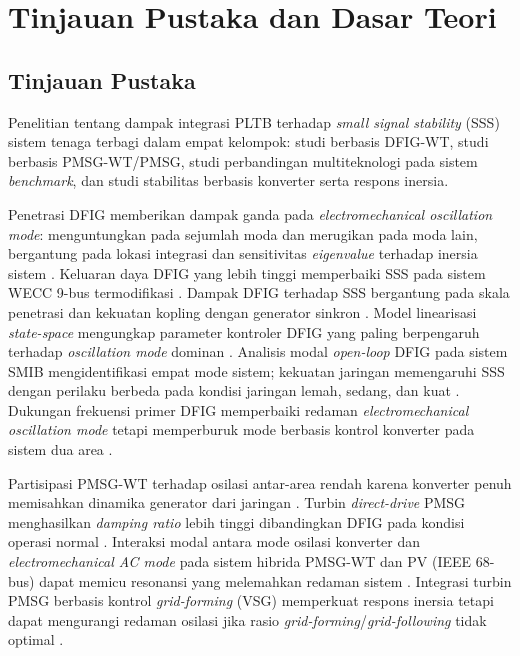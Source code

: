 \chapter{Tinjauan Pustaka dan Dasar Teori}

\section{Tinjauan Pustaka}

Penelitian tentang dampak integrasi PLTB terhadap \textit{small signal stability}
(SSS) sistem tenaga terbagi dalam empat kelompok: studi berbasis DFIG-WT, studi
berbasis PMSG-WT/PMSG, studi perbandingan multiteknologi pada sistem
\textit{benchmark}, dan studi stabilitas berbasis konverter serta respons inersia.

Penetrasi DFIG memberikan dampak ganda pada \textit{electromechanical oscillation mode}:
menguntungkan pada sejumlah moda dan merugikan pada moda lain, bergantung pada lokasi
integrasi dan sensitivitas \textit{eigenvalue} terhadap inersia sistem
\cite{gautam2009impact}. Keluaran daya DFIG yang lebih tinggi memperbaiki SSS pada
sistem WECC 9-bus termodifikasi \cite{sun2013small}. Dampak DFIG terhadap SSS
bergantung pada skala penetrasi dan kekuatan kopling dengan generator sinkron
\cite{liu2014impact}. Model linearisasi \textit{state-space} mengungkap parameter
kontroler DFIG yang paling berpengaruh terhadap \textit{oscillation mode} dominan
\cite{mehta2014}. Analisis modal \textit{open-loop} DFIG pada sistem SMIB
mengidentifikasi empat mode sistem; kekuatan jaringan memengaruhi SSS dengan
perilaku berbeda pada kondisi jaringan lemah, sedang, dan kuat \cite{nirala2025impact}.
Dukungan frekuensi primer DFIG memperbaiki redaman \textit{electromechanical oscillation mode} tetapi memperburuk mode berbasis kontrol konverter pada sistem dua
area \cite{pepiciello2022impact}.

Partisipasi PMSG-WT terhadap osilasi antar-area rendah karena konverter penuh
memisahkan dinamika generator dari jaringan \cite{knuppel2009small}. Turbin
\textit{direct-drive} PMSG menghasilkan \textit{damping ratio} lebih tinggi
dibandingkan DFIG pada kondisi operasi normal \cite{wu2009small}. Interaksi modal
antara mode osilasi konverter dan \textit{electromechanical AC mode} pada sistem hibrida
PMSG-WT dan PV (IEEE 68-bus) dapat memicu resonansi yang melemahkan redaman sistem
\cite{luo2021converter}. Integrasi turbin PMSG berbasis kontrol \textit{grid-forming}
(VSG) memperkuat respons inersia tetapi dapat mengurangi redaman osilasi jika rasio
\textit{grid-forming}/\textit{grid-following} tidak optimal \cite{li2024smallsignal}.

